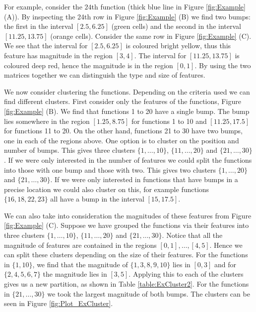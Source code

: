 \documentclass[../main.tex]{subfiles}
\begin{document}
 For example, consider the $24$th function (thick blue line in Figure \ref{fig:Example} (A)). By inspecting the 24th row in Figure \ref{fig:Example} (B) we find two bumps: the first in the interval $[2.5,6.25]$ (green cells) and the second in the interval $[11.25,13.75]$ (orange cells). Consider the same row in Figure \ref{fig:Example} (C). We see that the interval for $[2.5,6.25]$ is coloured bright yellow, thus this feature has magnitude in the region $[3,4]$. The interval for $[11.25,13.75]$ is coloured deep red, hence the magnitude is in the region $[0,1]$. By using the two matrices together we can distinguish the type and size of features. 

We now consider clustering the functions. Depending on the criteria used we can find different clusters. First consider only the features of the functions, Figure \ref{fig:Example} (B). We find that functions 1 to 20 have a single bump.  The bump lies somewhere in the region $[1.25,8.75]$ for functions 1 to 10 and $[11.25,17.5]$ for functions 11 to 20. On the other hand, functions 21 to 30 have two bumps, one in each of the regions above. One option is to cluster on the position and number of bumps. This gives three clusters $\{1,\dots,10\}$, $\{11,\dots,20\}$ and $\{21,\dots,30\}$. If we were only interested in the number of features we could split the functions into those with one bump and those with two. This gives two clusters $\{1,\dots,20\}$ and $\{21,\dots,30\}$. If we were only interested in functions that have bumps in a precise location we could also cluster on this, for example functions $\{16,18,22,23\}$ all have a bump in the interval $[15,17.5]$.


We can also take into consideration the magnitudes of these features from Figure \ref{fig:Example} (C). Suppose we have grouped the functions via their features into three clusters $\{1,\dots,10\}$, $\{11,\dots,20\}$ and $\{21,\dots,30\}$. Notice that all the magnitude of features are contained in the regions $[0,1], \dots, [4,5]$. Hence we can split these clusters depending on the size of their features. For the functions in $\{1,10\}$, we find that the magnitude of $\{1,3,8,9,10\}$ lies in $[0,3]$ and for $\{2,4,5,6,7\}$ the magnitude lies in $[3,5]$. Applying this to each of the clusters gives us a new partition, as shown in Table \ref{table:ExCluster2}. For the functions in $\{21,\dots,30\}$ we took the largest magnitude of both bumps. The clusters can be seen in Figure \ref{fig:Plot_ExCluster}.
\end{document}
